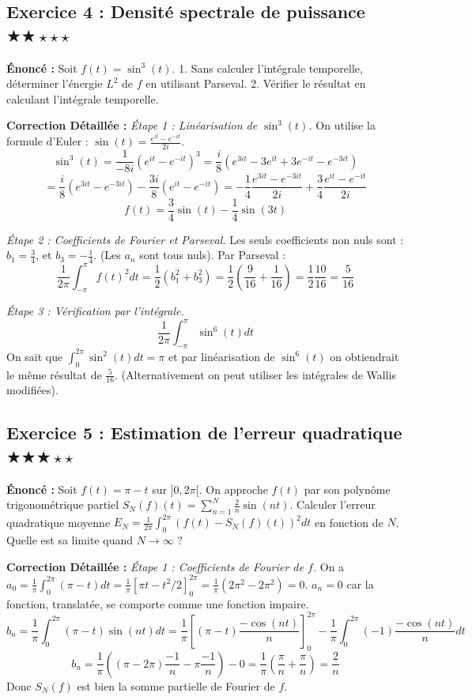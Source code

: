 \documentclass[11pt,a4paper]{article}
\begin{document}
\vspace{1cm}
\subsection*{Exercice 4 : Densité spectrale de puissance $\bigstar\bigstar\star\star\star$}

\textbf{Énoncé :} Soit $f(t) = \sin^3(t)$.
1. Sans calculer l'intégrale temporelle, déterminer l'énergie $L^2$ de $f$ en utilisant Parseval.
2. Vérifier le résultat en calculant l'intégrale temporelle.

\textbf{Correction Détaillée :}
\textit{Étape 1 : Linéarisation de $\sin^3(t)$.}
On utilise la formule d'Euler : $\sin(t) = \frac{e^{it} - e^{-it}}{2i}$.
$$\sin^3(t) = \frac{1}{-8i} (e^{it} - e^{-it})^3 = \frac{i}{8} (e^{3it} - 3e^{it} + 3e^{-it} - e^{-3it})$$
$$= \frac{i}{8} (e^{3it} - e^{-3it}) - \frac{3i}{8} (e^{it} - e^{-it}) = -\frac{1}{4} \frac{e^{3it} - e^{-3it}}{2i} + \frac{3}{4} \frac{e^{it} - e^{-it}}{2i}$$
$$f(t) = \frac{3}{4} \sin(t) - \frac{1}{4} \sin(3t)$$

\textit{Étape 2 : Coefficients de Fourier et Parseval.}
Les seuls coefficients non nuls sont :
$b_1 = \frac{3}{4}$, et $b_3 = -\frac{1}{4}$. (Les $a_n$ sont tous nuls).
Par Parseval :
$$\frac{1}{2\pi} \int_{-\pi}^\pi f(t)^2 dt = \frac{1}{2} (b_1^2 + b_3^2) = \frac{1}{2} \left( \frac{9}{16} + \frac{1}{16} \right) = \frac{1}{2} \frac{10}{16} = \frac{5}{16}$$

\textit{Étape 3 : Vérification par l'intégrale.}
$$\frac{1}{2\pi} \int_{-\pi}^\pi \sin^6(t) dt$$
On sait que $\int_0^{2\pi} \sin^2(t) dt = \pi$ et par linéarisation de $\sin^6(t)$ on obtiendrait le même résultat de $\frac{5}{16}$. (Alternativement on peut utiliser les intégrales de Wallis modifiées).

\vspace{1cm}
\subsection*{Exercice 5 : Estimation de l'erreur quadratique $\bigstar\bigstar\bigstar\star\star$}

\textbf{Énoncé :} Soit $f(t) = \pi - t$ sur $]0, 2\pi[$.
On approche $f(t)$ par son polynôme trigonométrique partiel $S_N(f)(t) = \sum_{n=1}^N \frac{2}{n} \sin(nt)$.
Calculer l'erreur quadratique moyenne $E_N = \frac{1}{2\pi} \int_0^{2\pi} (f(t) - S_N(f)(t))^2 dt$ en fonction de $N$. Quelle est sa limite quand $N \to \infty$ ?

\textbf{Correction Détaillée :}
\textit{Étape 1 : Coefficients de Fourier de $f$.}
On a $a_0 = \frac{1}{\pi} \int_0^{2\pi} (\pi - t) dt = \frac{1}{\pi} [\pi t - t^2/2]_0^{2\pi} = \frac{1}{\pi} (2\pi^2 - 2\pi^2) = 0$.
$a_n = 0$ car la fonction, translatée, se comporte comme une fonction impaire.
$$b_n = \frac{1}{\pi} \int_0^{2\pi} (\pi - t) \sin(nt) dt = \frac{1}{\pi} \left[ (\pi - t) \frac{-\cos(nt)}{n} \right]_0^{2\pi} - \frac{1}{\pi} \int_0^{2\pi} (-1) \frac{-\cos(nt)}{n} dt$$
$$b_n = \frac{1}{\pi} \left( (\pi - 2\pi) \frac{-1}{n} - \pi \frac{-1}{n} \right) - 0 = \frac{1}{\pi} \left( \frac{\pi}{n} + \frac{\pi}{n} \right) = \frac{2}{n}$$
Donc $S_N(f)$ est bien la somme partielle de Fourier de $f$.
\end{document}
